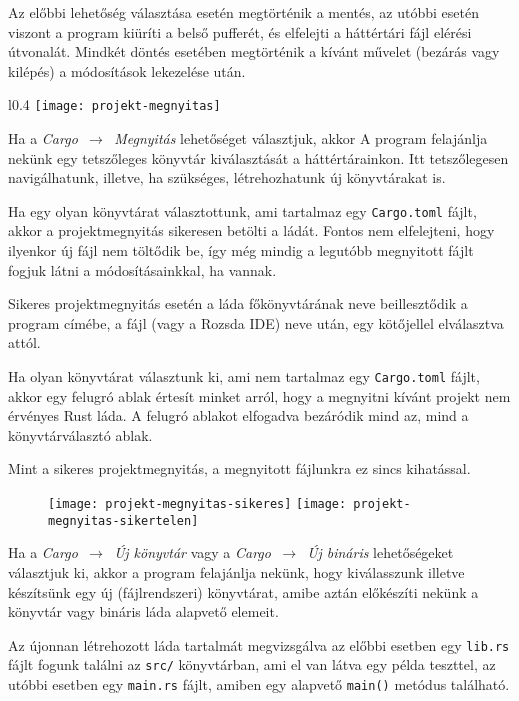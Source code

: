 Az előbbi lehetőség választása esetén megtörténik a mentés,
az utóbbi esetén viszont a program kiüríti a belső pufferét, és elfelejti a háttértári fájl elérési útvonalát.
Mindkét döntés esetében megtörténik a kívánt művelet (bezárás vagy kilépés) a módosítások lekezelése után.


\begin{wrapfigure}{l}{0.4\textwidth}
    \centering
    \texttt{[image: projekt-megnyitas]}
\end{wrapfigure}

Ha a \textit{Cargo $\,\to\,$ Megnyitás} lehetőséget választjuk, akkor A program felajánlja
nekünk egy tetszőleges könyvtár kiválasztását a háttértárainkon.
Itt tetszőlegesen navigálhatunk, illetve, ha szükséges, létrehozhatunk új könyvtárakat is.

Ha egy olyan könyvtárat választottunk, ami tartalmaz egy \texttt{Cargo.toml} fájlt,
akkor a projektmegnyitás sikeresen betölti a ládát.
Fontos nem elfelejteni, hogy ilyenkor új fájl nem töltődik be,
így még mindig a legutóbb megnyitott fájlt fogjuk látni a módosításainkkal, ha vannak.

Sikeres projektmegnyitás esetén a láda főkönyvtárának neve beillesztődik a program címébe,
a fájl (vagy a Rozsda IDE) neve után, egy kötőjellel elválasztva attól.

Ha olyan könyvtárat választunk ki, ami nem tartalmaz egy \texttt{Cargo.toml} fájlt,
akkor egy felugró ablak értesít minket arról, hogy a megnyitni kívánt projekt nem
érvényes Rust láda.
A felugró ablakot elfogadva bezáródik mind az, mind a könyvtárválasztó ablak.

Mint a sikeres projektmegnyitás, a megnyitott fájlunkra ez sincs kihatással.

\begin{figure}[h]
    \centering
    \texttt{[image: projekt-megnyitas-sikeres]}
    \texttt{[image: projekt-megnyitas-sikertelen]}
\end{figure}

Ha a \textit{Cargo $\,\to\,$ Új könyvtár} vagy a \textit{Cargo $\,\to\,$ Új bináris}
lehetőségeket választjuk ki, akkor a program felajánlja nekünk,
hogy kiválasszunk illetve készítsünk egy új (fájlrendszeri) könyvtárat,
amibe aztán előkészíti nekünk a könyvtár vagy bináris láda alapvető elemeit.

Az újonnan létrehozott láda tartalmát megvizsgálva az előbbi esetben egy \texttt{lib.rs}
fájlt fogunk találni az \texttt{src/} könyvtárban, ami el van látva egy példa teszttel, 
az utóbbi esetben egy \texttt{main.rs} fájlt, amiben egy alapvető \texttt{main()} metódus található.

